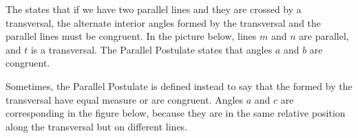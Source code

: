 \documentclass{ximera}
\begin{document}
\begin{definition}
The  states that if we have two parallel lines and they are crossed by a transversal, the alternate interior angles formed by the transversal and the parallel lines must be congruent. In the picture below, lines $m$ and $n$ are parallel, and $t$ is a transversal. The Parallel Postulate states that angles $a$ and $b$ are congruent.
\begin{image}
\end{image}
\end{definition}



Sometimes, the Parallel Postulate is defined instead to say that the  formed by the transversal have equal measure or are congruent. Angles $a$ and $c$ are corresponding in the figure below, because they are in the same relative position along the transversal but on different lines.

\begin{image}
\end{image}
\end{document}
